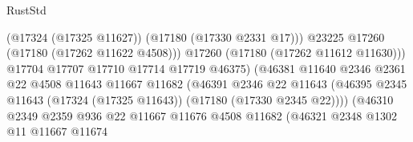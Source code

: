\begin{lexlean}{RustStd}
\begin{coremodule}
{\begin{coremodule}
{{{{{{{{{{{{{{{{{{{{{{{{{{{{{{{{{{{{{{{{{{{{{{{{{{{{{{{                                                    (@17324 (@17325 @11627))
                                                    (@17180 (@17330 @2331 @17)))
                                                  @23225
                                                  @17260
                                                  (@17180 (@17262 @11622 @4508)))
                                                @17260
                                                (@17180 (@17262 @11612 @11630)))
                                              @17704
                                              @17707
                                              @17710
                                              @17714
                                              @17719
                                              @46375)
                                            (@46381
                                              @11640
                                              @2346
                                              @2361
                                              @22
                                              @4508
                                              @11643
                                              @11667
                                              @11682
                                              (@46391
                                                @2346
                                                @22
                                                @11643
                                                (@46395
                                                  @2345
                                                  @11643
                                                  (@17324 (@17325 @11643))
                                                  (@17180 (@17330 @2345 @22))))
                                              (@46310
                                                @2349
                                                @2359
                                                @936
                                                @22
                                                @11667
                                                @11676
                                                @4508
                                                @11682
                                                (@46321
                                                  @2348
                                                  @1302
                                                  @11
                                                  @11667
                                                  @11674
}}}}}}}}}}}}}}}}}}}}}}}}}}}}}}}}}}}}}}}}}}}}}}}}}}}}}}}
\end{coremodule}}
\end{coremodule}
\end{lexlean}
